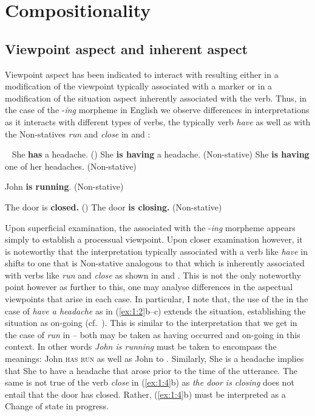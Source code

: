 \section{Compositionality}\label{sec:1.2}\largerpage
\subsection{Viewpoint aspect and inherent aspect}\label{sec:1.2.1}

Viewpoint aspect has been indicated to interact with  resulting
either in a modification of the viewpoint typically associated with a marker or
in a modification of the situation aspect inherently associated with the verb.
Thus, in the case of the  -\textit{ing} morpheme in English we
observe differences in interpretations as it interacts with different types of
verbs, the typically  verb \textit{have}  as well as with the
Non-statives \textit{run} and \textit{close} in  and :


\ea\label{ex:1:2}~\citep[adapted from][707]{Lyons1977}
  \ea She \textbf{has} a headache. ()
  \ex She \textbf{is having} a headache. (Non-stative)
  \ex She \textbf{is having} one of her headaches. (Non-stative)
  \z
\z

\ea\label{ex:1:3} John \textbf{is running}. (Non-stative) \z


\ea\label{ex:1:4}
  \ea The door is \textbf{closed.} ()
  \ex The door \textbf{is closing.} (Non-stative)
  \z
\z

Upon superficial examination, the   associated with
the \--\textit{ing} morpheme appears simply to establish a processual viewpoint.
Upon closer examination however, it is noteworthy that the 
interpretation typically associated with a verb like \textit{have} in 
shifts to one that is Non-stative analogous to that which is inherently
associated with verbs like \textit{run} and \textit{close} as shown in  and
. This is not the only noteworthy point however as further to this,
one may analyse differences in the aspectual viewpoints that arise in each case.
In particular, I note that, the use of the  in the case of  \textit{have a
headache} as in (\ref{ex:1:2}b--c) extends the situation, establishing the situation as
on-going (cf.\ \citealt{Guéron2008}). This is similar to the interpretation that we get
in the case of  \textit{run} in  -- both may be taken as having occurred
and on-going in this context. In other words \textit{John is running} must be
taken to encompass the meanings: John \textsc{has run} as well as John \CONTINUES to
\RUN\@.  Similarly, She is \HAVING a headache implies that She \CONTINUES to have a
headache that arose prior to the time of the utterance.  The same is not true of
the verb \textit{close} in (\ref{ex:1:4}b) as \textit{the door is closing} does not
entail that the door has closed.  Rather, (\ref{ex:1:4}b) must be interpreted as
a Change of state in progress.

